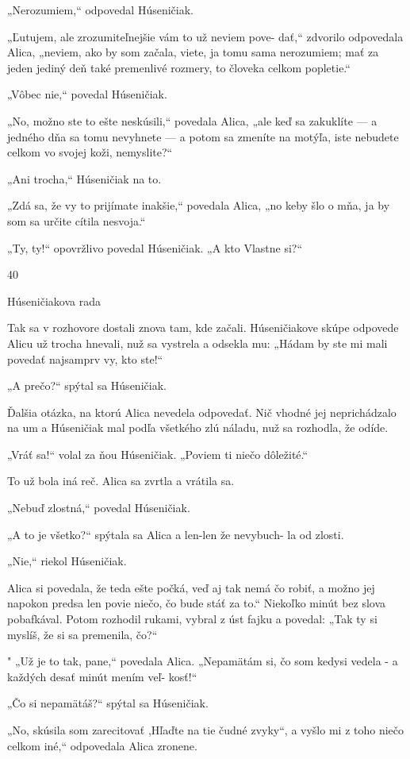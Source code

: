 \documentclass[12pt]{article}
\begin{document}
\begin{Parallel}[p]{}{}
{{„Nerozumiem,“ odpovedal Húseničiak.

„Ľutujem, ale zrozumiteľnejšie vám to už neviem pove-
dať,“ zdvorilo odpovedala Alica, „neviem, ako by som
začala, viete, ja tomu sama nerozumiem; mať za jeden
jediný deň také premenlivé rozmery, to človeka celkom
popletie.“

„Vôbec nie,“ povedal Húseničiak.

„No, možno ste to ešte neskúsili,“ povedala Alica, „ale
keď sa zakuklíte — a jedného dňa sa tomu nevyhnete
— a potom sa zmeníte na motýľa, iste nebudete celkom vo
svojej koži, nemyslite?“

„Ani trocha,“ Húseničiak na to.

„Zdá sa, že vy to prijímate inakšie,“ povedala Alica, „no
keby šlo o mňa, ja by som sa určite cítila nesvoja.“

„Ty, ty!“ opovržlivo povedal Húseničiak. „A kto Vlastne
si?“

40

Húseničiakova rada

Tak sa v rozhovore dostali znova tam, kde začali.
Húseničiakove skúpe odpovede Alicu už trocha hnevali, nuž
sa vystrela a odsekla mu: „Hádam by ste mi mali povedať
najsamprv vy, kto ste!“

„A prečo?“ spýtal sa Húseničiak.

Ďalšia otázka, na ktorú Alica nevedela odpovedať. Nič
vhodné jej neprichádzalo na um a Húseničiak mal podľa
všetkého zlú náladu, nuž sa rozhodla, že odíde.

„Vráť sa!“ volal za ňou Húseničiak. „Poviem ti niečo
dôležité.“

To už bola iná reč. Alica sa zvrtla a vrátila sa.

„Nebuď zlostná,“ povedal Húseničiak.

„A to je všetko?“ spýtala sa Alica a len-len že nevybuch-
la od zlosti.

„Nie,“ riekol Húseničiak.

Alica si povedala, že teda ešte počká, veď aj tak nemá čo
robiť, a možno jej napokon predsa len povie niečo, čo bude
stáť za to.“ Niekoľko minút bez slova pobafkával. Potom
rozhodil rukami, vybral z úst fajku a povedal: „Tak ty si
myslíš, že si sa premenila, čo?“

" „Už je to tak, pane,“ povedala Alica. „Nepamätám si, čo
som kedysi vedela - a každých desať minút mením veľ-
kosť!“

„Čo si nepamätáš?“ spýtal sa Húseničiak.

„No, skúsila som zarecitovať ,Hľaďte na tie čudné zvyky“,
a vyšlo mi z toho niečo celkom iné,“ odpovedala Alica
zronene.

}}
\end{Parallel}
\end{document}
